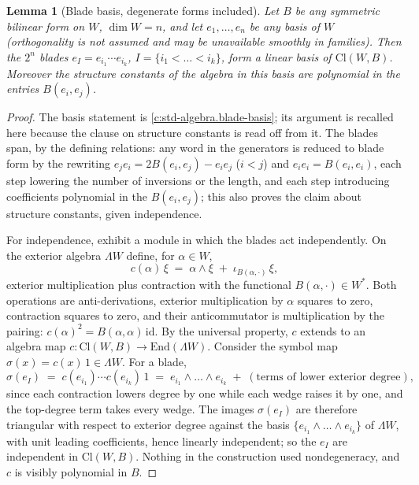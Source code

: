 \documentclass[11pt]{article}
\newtheorem{lemma}[theorem]{Lemma}
\theoremstyle{definition}
\theoremstyle{plain}
\newcommand{\changedmark}[2]{\marginpar{\raggedright\scriptsize\color{#1}#2}}
\providecommand{\Cl}{}\renewcommand{\Cl}{\mathrm{Cl}}
\begin{document}
\begin{lemma}[Blade basis, degenerate forms included]\label{c:sheaf.blade-basis-degenerate-forms-included}
\changedmark{gray}{reworded}
Let $B$ be any symmetric bilinear form on $W$, $\dim W = n$, and let $e_1, \dots, e_n$ be \emph{any} basis of $W$ (orthogonality is not assumed and may be unavailable smoothly in families). Then the $2^n$ blades $e_I = e_{i_1} \cdots e_{i_k}$, $I = \{i_1 < \dots < i_k\}$, form a linear basis of $\Cl(W, B)$. Moreover the structure constants of the algebra in this basis are polynomial in the entries $B(e_i, e_j)$.
\end{lemma}
\begin{proof}
The basis statement is \ref{c:std-algebra.blade-basis}; its argument is recalled here because the clause on structure constants is read off from it. The blades span, by the defining relations: any word in the generators is reduced to blade form by the rewriting $e_j e_i = 2B(e_i, e_j) - e_i e_j$ ($i < j$) and $e_i e_i = B(e_i, e_i)$, each step lowering the number of inversions or the length, and each step introducing coefficients polynomial in the $B(e_i,e_j)$; this also proves the claim about structure constants, given independence.

For independence, exhibit a module in which the blades act independently. On the exterior algebra $\Lambda W$ define, for $\alpha \in W$,
\[
c(\alpha)\,\xi \;=\; \alpha \wedge \xi \;+\; \iota_{B(\alpha, \cdot)}\,\xi ,
\]
exterior multiplication plus contraction with the functional $B(\alpha, \cdot) \in W^*$. Both operations are anti-derivations, exterior multiplication by $\alpha$ squares to zero, contraction squares to zero, and their anticommutator is multiplication by the pairing: $c(\alpha)^2 = B(\alpha,\alpha)\,\mathrm{id}$. By the universal property, $c$ extends to an algebra map $c : \Cl(W,B) \to \mathrm{End}(\Lambda W)$. Consider the symbol map $\sigma(x) = c(x)\,1 \in \Lambda W$. For a blade,
\[
\sigma(e_I) \;=\; c(e_{i_1}) \cdots c(e_{i_k})\,1 \;=\; e_{i_1} \wedge \dots \wedge e_{i_k} \;+\; (\text{terms of lower exterior degree}),
\]
since each contraction lowers degree by one while each wedge raises it by one, and the top-degree term takes every wedge. The images $\sigma(e_I)$ are therefore triangular with respect to exterior degree against the basis $\{e_{i_1} \wedge \dots \wedge e_{i_k}\}$ of $\Lambda W$, with unit leading coefficients, hence linearly independent; so the $e_I$ are independent in $\Cl(W,B)$. Nothing in the construction used nondegeneracy, and $c$ is visibly polynomial in $B$.

\end{proof}
\end{document}
